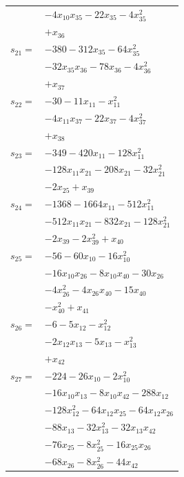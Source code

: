 \begin{longtable}{@{}r@{\;}l@{}}
 & \(\displaystyle -4x_{10}x_{35} -22x_{35} -4x_{35}^{2}\) \\
 & \(\displaystyle +x_{36}\) \\[3pt]
\(s_{21}=\) & \(\displaystyle -380 -312x_{35} -64x_{35}^{2}\) \\
 & \(\displaystyle -32x_{35}x_{36} -78x_{36} -4x_{36}^{2}\) \\
 & \(\displaystyle +x_{37}\) \\[3pt]
\(s_{22}=\) & \(\displaystyle -30 -11x_{11} -x_{11}^{2}\) \\
 & \(\displaystyle -4x_{11}x_{37} -22x_{37} -4x_{37}^{2}\) \\
 & \(\displaystyle +x_{38}\) \\[3pt]
\(s_{23}=\) & \(\displaystyle -349 -420x_{11} -128x_{11}^{2}\) \\
 & \(\displaystyle -128x_{11}x_{21} -208x_{21} -32x_{21}^{2}\) \\
 & \(\displaystyle -2x_{25} +x_{39}\) \\[3pt]
\(s_{24}=\) & \(\displaystyle -1368 -1664x_{11} -512x_{11}^{2}\) \\
 & \(\displaystyle -512x_{11}x_{21} -832x_{21} -128x_{21}^{2}\) \\
 & \(\displaystyle -2x_{39} -2x_{39}^{2} +x_{40}\) \\[3pt]
\(s_{25}=\) & \(\displaystyle -56 -60x_{10} -16x_{10}^{2}\) \\
 & \(\displaystyle -16x_{10}x_{26} -8x_{10}x_{40} -30x_{26}\) \\
 & \(\displaystyle -4x_{26}^{2} -4x_{26}x_{40} -15x_{40}\) \\
 & \(\displaystyle -x_{40}^{2} +x_{41}\) \\[3pt]
\(s_{26}=\) & \(\displaystyle -6 -5x_{12} -x_{12}^{2}\) \\
 & \(\displaystyle -2x_{12}x_{13} -5x_{13} -x_{13}^{2}\) \\
 & \(\displaystyle +x_{42}\) \\[3pt]
\(s_{27}=\) & \(\displaystyle -224 -26x_{10} -2x_{10}^{2}\) \\
 & \(\displaystyle -16x_{10}x_{13} -8x_{10}x_{42} -288x_{12}\) \\
 & \(\displaystyle -128x_{12}^{2} -64x_{12}x_{25} -64x_{12}x_{26}\) \\
 & \(\displaystyle -88x_{13} -32x_{13}^{2} -32x_{13}x_{42}\) \\
 & \(\displaystyle -76x_{25} -8x_{25}^{2} -16x_{25}x_{26}\) \\
 & \(\displaystyle -68x_{26} -8x_{26}^{2} -44x_{42}\) \\

\end{longtable}
